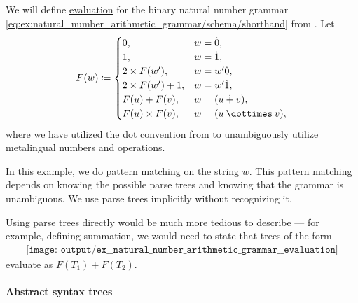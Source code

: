 \begin{example}\label{ex:natural_number_arithmetic_grammar/evaluation}
  We will define \hyperref[con:evaluation]{evaluation} for the binary natural number grammar \eqref{eq:ex:natural_number_arithmetic_grammar/schema/shorthand} from . Let
  \begin{equation*}
    F(w) \coloneqq \begin{cases}
      0,                  &w = \syn0, \\
      1,                  &w = \syn1, \\
      2 \times F(w'),     &w = w' \syn0, \\
      2 \times F(w') + 1, &w = w' \syn1, \\
      F(u) + F(v),        &w = (u \synplus v), \\
      F(u) \times F(v),   &w = (u \syntimes v),
    \end{cases}
  \end{equation*}
  where we have utilized the dot convention from  to unambiguously utilize metalingual numbers and operations.

  In this example, we do pattern matching on the string \( w \). This pattern matching depends on knowing the possible parse trees and knowing that the grammar is unambiguous. We use parse trees implicitly without recognizing it.

  Using parse trees directly would be much more tedious to describe --- for example, defining summation, we would need to state that trees of the form
  \begin{equation*}
    \begin{aligned}
      \texttt{[image: output/ex\_\_natural\_number\_arithmetic\_grammar\_\_evaluation]}
    \end{aligned}
  \end{equation*}
  evaluate as \( F(T_1) + F(T_2) \).
\end{example}

\paragraph{Abstract syntax trees}

